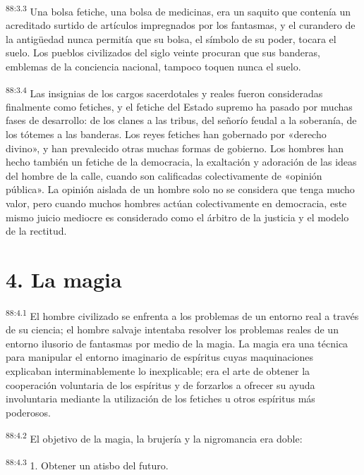 \par
\textsuperscript{88:3.3} Una bolsa fetiche, una bolsa de medicinas, era un saquito que contenía un acreditado surtido de artículos impregnados por los fantasmas, y el curandero de la antig\"uedad nunca permitía que su bolsa, el símbolo de su poder, tocara el suelo. Los pueblos civilizados del siglo veinte procuran que sus banderas, emblemas de la conciencia nacional, tampoco toquen nunca el suelo.

\par
\textsuperscript{88:3.4} Las insignias de los cargos sacerdotales y reales fueron consideradas finalmente como fetiches, y el fetiche del Estado supremo ha pasado por muchas fases de desarrollo: de los clanes a las tribus, del señorío feudal a la soberanía, de los tótemes a las banderas. Los reyes fetiches han gobernado por «derecho divino», y han prevalecido otras muchas formas de gobierno. Los hombres han hecho también un fetiche de la democracia, la exaltación y adoración de las ideas del hombre de la calle, cuando son calificadas colectivamente de «opinión pública». La opinión aislada de un hombre solo no se considera que tenga mucho valor, pero cuando muchos hombres actúan colectivamente en democracia, este mismo juicio mediocre es considerado como el árbitro de la justicia y el modelo de la rectitud.

\section*{4. La magia}
\par
\textsuperscript{88:4.1} El hombre civilizado se enfrenta a los problemas de un entorno real a través de su ciencia; el hombre salvaje intentaba resolver los problemas reales de un entorno ilusorio de fantasmas por medio de la magia. La magia era una técnica para manipular el entorno imaginario de espíritus cuyas maquinaciones explicaban interminablemente lo inexplicable; era el arte de obtener la cooperación voluntaria de los espíritus y de forzarlos a ofrecer su ayuda involuntaria mediante la utilización de los fetiches u otros espíritus más poderosos.

\par
\textsuperscript{88:4.2} El objetivo de la magia, la brujería y la nigromancia era doble:

\par
\textsuperscript{88:4.3} 1. Obtener un atisbo del futuro.

